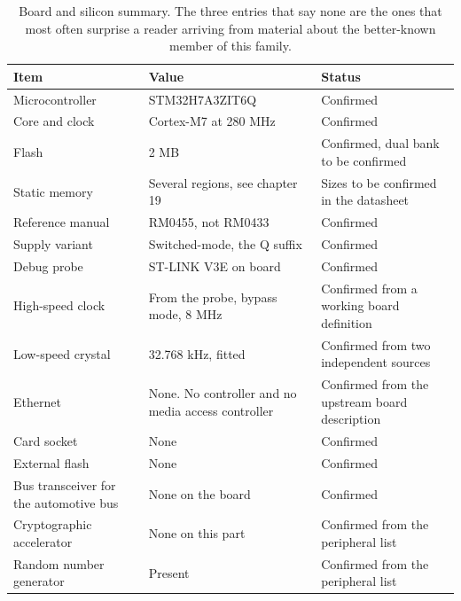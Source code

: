 \begin{table}[H]\centering\small
\begin{tabular}{p{44mm}p{44mm}p{62mm}}
\toprule
Item & Value & Status \\
\midrule
Microcontroller & STM32H7A3ZIT6Q & Confirmed \\
Core and clock & Cortex-M7 at 280 MHz & Confirmed \\
Flash & 2 MB & Confirmed, dual bank to be confirmed \\
Static memory & Several regions, see chapter 19 & Sizes to be confirmed in the datasheet \\
Reference manual & RM0455, not RM0433 & Confirmed \\
Supply variant & Switched-mode, the Q suffix & Confirmed \\
Debug probe & ST-LINK V3E on board & Confirmed \\
High-speed clock & From the probe, bypass mode, 8 MHz & Confirmed from a working board definition \\
Low-speed crystal & 32.768 kHz, fitted & Confirmed from two independent sources \\
Ethernet & None. No controller and no media access controller & Confirmed from the upstream board description \\
Card socket & None & Confirmed \\
External flash & None & Confirmed \\
Bus transceiver for the automotive bus & None on the board & Confirmed \\
Cryptographic accelerator & None on this part & Confirmed from the peripheral list \\
Random number generator & Present & Confirmed from the peripheral list \\
\bottomrule
\end{tabular}
\caption{Board and silicon summary. The three entries that say none are the ones that most often surprise a reader arriving from material about the better-known member of this family.}
\end{table}

